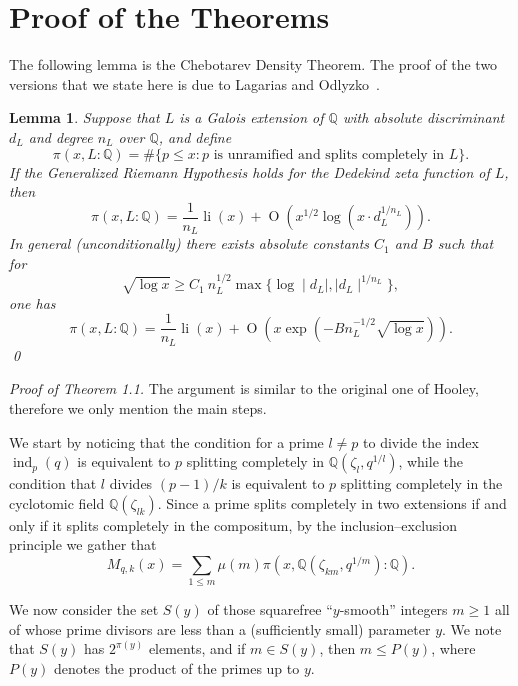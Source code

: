 \documentclass[twoside,final,reqno,noamsfonts]{birkartspecial}
\newtheorem{lemma}[theorem]{Lemma}
\begin{document}
\section{Proof of the Theorems}

The following lemma is the Chebotarev Density Theorem. The proof of the two versions that we
state here is due to Lagarias and Odlyzko~\cite{L-O}.

\begin{lemma} \label{cdt}
Suppose that $L$ is a Galois extension of ${\mathbb Q}$ with absolute discriminant $d_L$ and degree
$n_L$ over ${\mathbb Q}$, and define
$$\pi(x,L\colon{\mathbb Q})=\#\{p\leq x \colon  p \text{ is unramified and
splits completely in } L\}.
$$
If the Generalized Riemann Hypothesis holds for the Dedekind zeta function of $L$, then
$$
\pi(x,L\colon{\mathbb Q})= \frac{1}{n_L}\operatorname{li}{(x)}+ \operatorname{O}(x^{1/2}\log (x\cdot d_L^{1/n_L})).
$$
In general (unconditionally)
there exists absolute constants $C_1$ and $B$ such that for
\begin{equation}
\sqrt{\log x}\geq C_1\ n_L^{1/2}\max\{\log\mid d_L\mid,
\mid d_L\mid^{1/n_L}\},\end{equation}
one has
$$\pi(x,L\colon{\mathbb Q})= \frac{1}{n_L}\operatorname{li}(x)+\operatorname{O}(x\exp({-B n_L^{-1/2}\sqrt{\log x}})).
$$\qed
\end{lemma}

\removelastskip\par\medskip
\noindent\emph{Proof of Theorem 1.1.}
The argument is similar to the original one of Hooley, therefore we  only
mention the main steps.

We start by noticing that the condition for a prime $l\not=
 p$ to divide the index
$\operatorname{ind}_p(q)$
is equivalent to $p$ splitting completely in
${\mathbb Q}(\zeta_l,q^{1/l})$, while the condition that
$l$ divides $(p-1)/k$
is equivalent to $p$ splitting completely in the cyclotomic field
${\mathbb Q}(\zeta_{lk})$. Since a prime splits completely in two
extensions if and only if it splits completely in the compositum,
by the inclusion--exclusion principle we gather that
$$M_{q,k}(x)=\sum_{1\le m}\mu(m)\pi(x,{\mathbb Q}(\zeta_{km},q^{1/m})
\colon{\mathbb Q}).$$

We now consider the set $S(y)$ of those squarefree
``$y$-smooth'' integers $m \ge 1$
all of whose prime divisors are less
than a (sufficiently small) parameter $y$. We note that
$S(y)$ has $2^{\pi(y)}$ elements, and if $m\in S(y)$, then $m\leq P(y)$,
where $P(y)$ denotes the product of the primes up to $y$.
\end{document}
